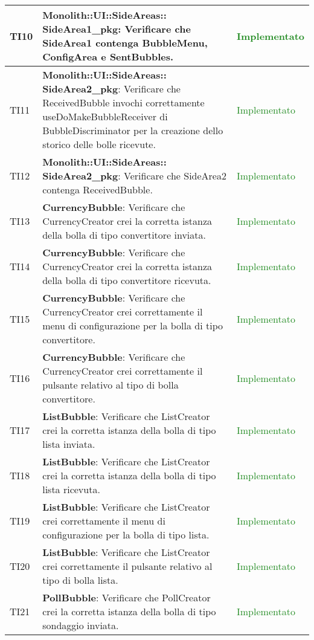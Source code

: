 \begin{center}
\begin{longtable}{|
*{1}{>{\centering\arraybackslash}p{1cm}|}
*{1}{>{\centering\arraybackslash}p{7cm}|}
*{1}{>{\centering\arraybackslash}p{3cm}|}}
 \hline 
TI10 & \textbf{Monolith::UI::SideAreas:: SideArea1\_pkg}: Verificare che SideArea1 contenga BubbleMenu, ConfigArea e SentBubbles. & \textcolor{ForestGreen}{Implementato}\\
 \hline 
TI11 & \textbf{Monolith::UI::SideAreas:: SideArea2\_pkg}: Verificare che ReceivedBubble invochi correttamente useDoMakeBubbleReceiver di BubbleDiscriminator per la creazione dello storico delle bolle ricevute. & \textcolor{ForestGreen}{Implementato}\\
 \hline 
TI12 & \textbf{Monolith::UI::SideAreas:: SideArea2\_pkg}: Verificare che SideArea2 contenga ReceivedBubble. & \textcolor{ForestGreen}{Implementato}\\
 \hline 
TI13 & \textbf{CurrencyBubble}: Verificare che CurrencyCreator crei la corretta istanza della bolla di tipo convertitore inviata. & \textcolor{ForestGreen}{Implementato}\\
 \hline 
TI14 & \textbf{CurrencyBubble}: Verificare che CurrencyCreator crei la corretta istanza della bolla di tipo convertitore ricevuta. & \textcolor{ForestGreen}{Implementato}\\
 \hline 
TI15 & \textbf{CurrencyBubble}: Verificare che CurrencyCreator crei correttamente il menu di configurazione per la bolla di tipo convertitore. & \textcolor{ForestGreen}{Implementato}\\
 \hline 
TI16 & \textbf{CurrencyBubble}: Verificare che CurrencyCreator crei correttamente il pulsante relativo al tipo di bolla convertitore. & \textcolor{ForestGreen}{Implementato}\\
 \hline 
TI17 & \textbf{ListBubble}: Verificare che ListCreator crei la corretta istanza della bolla di tipo lista inviata. & \textcolor{ForestGreen}{Implementato}\\
 \hline 
TI18 & \textbf{ListBubble}: Verificare che ListCreator crei la corretta istanza della bolla di tipo lista ricevuta. & \textcolor{ForestGreen}{Implementato}\\
 \hline 
TI19 & \textbf{ListBubble}: Verificare che ListCreator crei correttamente il menu di configurazione per la bolla di tipo lista. & \textcolor{ForestGreen}{Implementato}\\
 \hline 
TI20 & \textbf{ListBubble}: Verificare che ListCreator crei correttamente il pulsante relativo al tipo di bolla lista. & \textcolor{ForestGreen}{Implementato}\\
 \hline 
TI21 & \textbf{PollBubble}: Verificare che PollCreator crei la corretta istanza della bolla di tipo sondaggio inviata. & \textcolor{ForestGreen}{Implementato}\\

\end{longtable}
\end{center}
